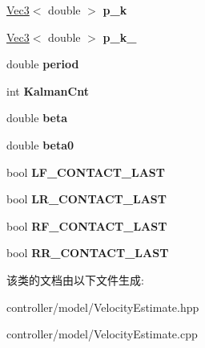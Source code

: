 \begin{DoxyCompactItemize}
\item 
\mbox{\label{classVelocityEstimate_a6768182b72f5e7b5740d2dcb4cafdb58}} 
\hyperlink{cppTypes_8h_a65c27bf97693676535dd0b30ea0ad399}{Vec3}$<$ double $>$ {\bfseries p\+\_\+k}
\item 
\mbox{\label{classVelocityEstimate_aa9a10d93303fc2e45c64b62174709829}} 
\hyperlink{cppTypes_8h_a65c27bf97693676535dd0b30ea0ad399}{Vec3}$<$ double $>$ {\bfseries p\+\_\+k\+\_}
\item 
\mbox{\label{classVelocityEstimate_afe01933af002a6cba2a508762ff3575e}} 
double {\bfseries period}
\item 
\mbox{\label{classVelocityEstimate_a9a8ef52cf51d26ed461ba2ed18f67ac8}} 
int {\bfseries Kalman\+Cnt}
\item 
\mbox{\label{classVelocityEstimate_a9baac12724cd33dcc783a0e095cfbe92}} 
double {\bfseries beta}
\item 
\mbox{\label{classVelocityEstimate_a2aed35608331ff88ed08b09f652a23c8}} 
double {\bfseries beta0}
\item 
\mbox{\label{classVelocityEstimate_a2270945e17b832a0a96f0b33f8a815b4}} 
bool {\bfseries L\+F\+\_\+\+C\+O\+N\+T\+A\+C\+T\+\_\+\+L\+A\+ST}
\item 
\mbox{\label{classVelocityEstimate_ae895f0eea0bf1329508413dbc541ce0e}} 
bool {\bfseries L\+R\+\_\+\+C\+O\+N\+T\+A\+C\+T\+\_\+\+L\+A\+ST}
\item 
\mbox{\label{classVelocityEstimate_aa775a4690122ef0cc76a13878e3325b7}} 
bool {\bfseries R\+F\+\_\+\+C\+O\+N\+T\+A\+C\+T\+\_\+\+L\+A\+ST}
\item 
\mbox{\label{classVelocityEstimate_a7f15cd4566dc39a2ad6c9360a1fbde23}} 
bool {\bfseries R\+R\+\_\+\+C\+O\+N\+T\+A\+C\+T\+\_\+\+L\+A\+ST}
\end{DoxyCompactItemize}


该类的文档由以下文件生成\+:\begin{DoxyCompactItemize}
\item 
controller/model/Velocity\+Estimate.\+hpp\item 
controller/model/Velocity\+Estimate.\+cpp\end{DoxyCompactItemize}
